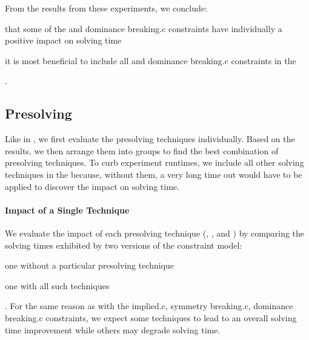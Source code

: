 From the results from these experiments, we conclude:
%
\begin{enumerate*}[label=(\roman*), itemjoin={;\ }, itemjoin*={; but\ }]
  \item that some of the  and \gls{dominance
    breaking.c} \glspl{constraint} have individually a positive impact on
    solving time
  \item it is most beneficial to include all  and
    \gls{dominance breaking.c} \glspl{constraint} in the 
\end{enumerate*}.


\subsection{Presolving}

Like in , we first evaluate the \gls{presolving}
techniques individually.
%
Based on the results, we then arrange them into groups to find the best
combination of \gls{presolving} techniques.
%
To curb experiment runtimes, we include all other solving techniques in the
 because, without them, a very long time out would
have to be applied to discover the impact on solving time.


\paragraph{Impact of a Single Technique}

We evaluate the impact of each \gls{presolving} technique
(,
,
and ) by comparing the solving times
exhibited by two versions of the \gls{constraint model}:
%
\begin{modelList}
  \item {}
    one without a particular \gls{presolving} technique
  \item {}
    one with all such techniques
\end{modelList}.
%
For the same reason as with the \gls{implied.c}, \gls{symmetry breaking.c},
\gls{dominance breaking.c} \glspl{constraint}, we expect some techniques to lead
to an overall solving time improvement while others may degrade solving time.

